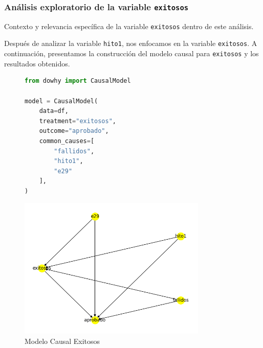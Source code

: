 

\subsubsection{Análisis exploratorio de la variable \texttt{exitosos}}
Contexto y relevancia específica de la variable \texttt{exitosos} dentro de este análisis.


Después de analizar la variable \texttt{hito1}, nos enfocamos en la variable \texttt{exitosos}. A continuación, presentamos la construcción del modelo causal para \texttt{exitosos} y los resultados obtenidos.

\begin{figure}[H]
    \centering
    \begin{minipage}{0.48\textwidth}
        \begin{lstlisting}[language=Python, caption=Modelo causal exitosos, label=lst:model_causalExitosos]
from dowhy import CausalModel

model = CausalModel(
    data=df,
    treatment="exitosos",
    outcome="aprobado",
    common_causes=[
        "fallidos",
        "hito1",
        "e29"
    ],
)
        \end{lstlisting}
    \end{minipage}
    \hfill
    \begin{minipage}{0.48\textwidth}
        \centering
        \includegraphics[width=0.8\textwidth]{img/causalidad/graph_causal_model_exitosos.png}
        \caption{Modelo Causal Exitosos}
        \label{fig:modelo_causal_exitosos}
    \end{minipage}
\end{figure}

